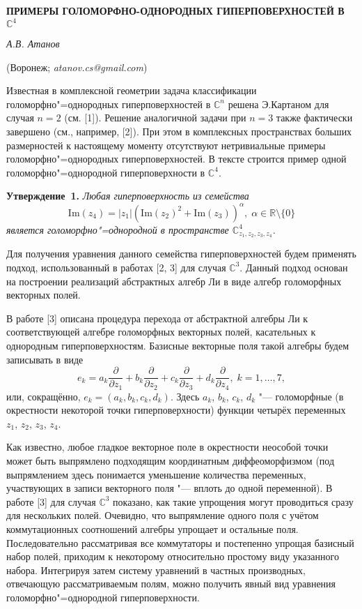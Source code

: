 \begin{center}
    {\bf ПРИМЕРЫ ГОЛОМОРФНО-ОДНОРОДНЫХ ГИПЕРПОВЕРХНОСТЕЙ В $\mathbb{C}^4$}

    {\it А.В. Атанов}

    (Воронеж; {\it atanov.cs@gmail.com})
\end{center}


Известная в комплексной геометрии задача классификации голоморфно"=однородных гиперповерхностей в $\mathbb{C}^n$ решена Э.Картаном для случая $n = 2$ (см. [1]). Решение аналогичной задачи при $n = 3$ также фактически завершено (см., например, [2]). При этом в комплексных пространствах больших размерностей к настоящему моменту отсутствуют нетривиальные примеры голоморфно"=однородных гиперповерхностей. В тексте строится пример одной голоморфно"=однородной гиперповерхности в $\mathbb{C}^4$.

\textbf{Утверждение~1.} {\it Любая гиперповерхность из семейства
$$\mathrm{Im}(z_4) = |z_1| \left(\mathrm{Im}(z_2)^2 + \mathrm{Im}(z_3)\right)^\alpha , \; \alpha \in \mathbb{R}\setminus\{0\}$$
является голоморфно"=однородной в пространстве $\mathbb{C}^4_{z_1, z_2, z_3, z_4}$.}

Для получения уравнения данного семейства гиперповерхностей будем применять подход, использованный в работах [2, 3] для случая $\mathbb{C}^3$. Данный подход основан на построении реализаций абстрактных алгебр Ли в виде алгебр голоморфных векторных полей.

В работе [3] описана процедура перехода от абстрактной алгебры Ли к соответствующей алгебре голоморфных векторных полей, касательных к однородным гиперповерхностям. Базисные векторные поля такой алгебры будем записывать в виде
$$
e_k = a_k\frac{\partial}{\partial z_1} + b_k\frac{\partial}{\partial z_2} + c_k\frac{\partial}{\partial z_3} + d_k\frac{\partial}{\partial z_4}, \; k = 1, \ldots, 7,
$$
или, сокращённо, $e_k = \left( a_k, b_k, c_k, d_k\right)$. Здесь $a_k$, $b_k$, $c_k$, $d_k$ "--- голоморфные (в окрестности некоторой точки гиперповерхности) функции четырёх переменных $z_1$, $z_2$, $z_3$, $z_4$.

Как известно, любое гладкое векторное поле в окрестности неособой точки может быть выпрямлено подходящим координатным диффеоморфизмом (под выпрямлением здесь понимается уменьшение количества переменных, участвующих в записи векторного поля "--- вплоть до одной переменной). В работе [3] для случая $\mathbb{C}^3$ показано, как такие упрощения могут проводиться сразу для нескольких полей. Очевидно, что выпрямление одного поля с учётом коммутационных соотношений алгебры упрощает и остальные поля. Последовательно рассматривая все коммутаторы и постепенно упрощая базисный набор полей, приходим к некоторому относительно простому виду указанного набора. Интегрируя затем систему уравнений в частных производных, отвечающую рассматриваемым полям, можно получить явный вид уравнения голоморфно"=однородной гиперповерхности.

